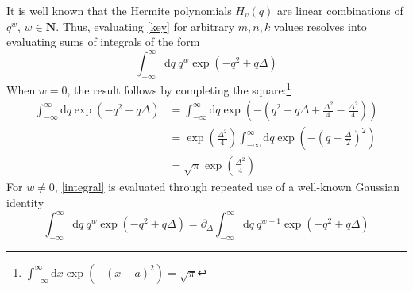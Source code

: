 \documentclass[aip, jcp, reprint, onecolumn, nofootinbib]{revtex4-2}
\begin{document}
It is well known that the Hermite polynomials $H_v(q)$ are linear combinations of $q^w$, $w \in \mathbf{N}$. 
Thus, evaluating \autoref{key} for arbitrary $m,n,k$ values resolves into evaluating sums of integrals of the form
\begin{equation}\label{integral}
	\int_{-\infty}^\infty \mathrm{d}q \ q^w \exp(-q^2 + q\Delta)
\end{equation}
When $w=0$, the result follows by completing the square:\footnote{$\int_{-\infty}^{\infty} \mathrm{d}x \exp(-(x-a)^2) = \sqrt{\pi}$}
\begin{equation}
	\begin{split}
		\int_{-\infty}^\infty \mathrm{d}q \exp(-q^2 + q\Delta) &= \int_{-\infty}^\infty \mathrm{d}q \exp(-(q^2 - q\Delta +\frac{\Delta^2}{4} - \frac{\Delta^2}{4}))\\
		&= \exp(\frac{\Delta^2}{4}) \int_{-\infty}^\infty \mathrm{d}q \exp(-(q - \frac{\Delta}{2})^2) \\
		&= \sqrt{\pi} \exp(\frac{\Delta^2}{4})
	\end{split}
\end{equation}
 For $w \neq 0$, \autoref{integral} is evaluated through repeated use of a well-known Gaussian identity
\begin{equation}\label{identity}
	\int_{-\infty}^\infty \mathrm{d}q \ q^w \exp(-q^2 + q\Delta) = \partial_{\Delta} \int_{-\infty}^\infty \mathrm{d}q \ q^{w-1} \exp(-q^2 + q\Delta)
\end{equation}
\end{document}
